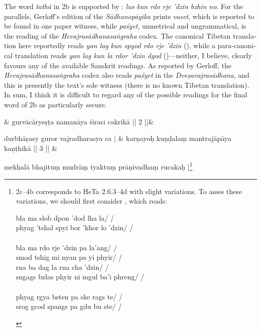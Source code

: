 \documentclass[naipra.tex]{subfiles}
\begin{document}
\begin{sanskrit}
{\begin{english}
	The word \emph{tathā} in 2b is supported by \TIB : \emph{lus kun rdo rje 'dzin bzhin no}.
	For the parallels, Gerloff's edition of the \emph{Sādhanopāyika} prints \emph{vaset}, which is reported to be found in one paper witness, while \emph{paśyet}, unmetrical and ungrammatical, is the reading of the \emph{Hevajrasādhanasaṅgraha} codex.
	The canonical Tibetan translation here reportedly reads \emph{yan lag kun spyod rdo rje 'dzin} (\cite[vol.\ 1 135]{gerloff2020}), while a para-canonical translation reads \emph{yan lag kun la rdor 'dzin dgod} (\cite[vol.\ 2 152]{gerloff2020})—neither, I believe, clearly favours any of the available Sanskrit readings.
	As reported by Gerloff, the \emph{Hevajrasādhanasaṅgraha} codex also reads \emph{paśyet} in the \emph{Dveṣavajrasādhana}, and this is presently the text's sole witness (there is no known Tibetan translation).
	In sum, I think it is difficult to regard any of the possible readings for the final word of 2b as particularly secure.
	\label{2bnote}
\end{english}} & 
gurvācāryeṣṭa namanāya śirasi cakrikā || 2 ||\&


\medskip\versequote
durbhāṣasy guror vajradharasya ca | &
karṇayoḥ kuṇḍalaṃ  mantrajāpāya kaṇṭhikā || 3 || \& 


\medskip\versequote 
mekhalā bhajituṃ mudrāṃ tyaktuṃ prāṇivadhaṃ rucakaḥ |\footnote{\begin{english}
	2c–4b corresponds to HeTa 2.6.3–4d with slight variations.
	To asses these variations, we should first consider \TIB, which reads: 

	\begin{prosequote}%
		bla ma slob dpon 'dod lha la/ /\\
		phyag 'tshal spyi bor 'khor lo 'dzin/ /\\
		\\
		bla ma rdo rje 'dzin pa la'ang/ /\\
		smod tshig mi nyan pa yi phyir/ /\\
		rna ba dag la rna cha 'dzin/ /\\
		sngags bzlas phyir ni mgul ba'i phreng/ /\\
		\\
		phyag rgya bsten pa ske rags te/ /\\
		srog gcod spangs pa gdu bu ste/ /
	\end{prosequote}


\end{english}}
\end{sanskrit}
\end{document}
